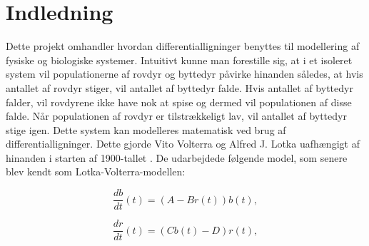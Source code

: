 \chapter{Indledning}





Dette projekt omhandler hvordan differentialligninger benyttes til modellering af fysiske og biologiske systemer. Intuitivt kunne man forestille sig, at i et isoleret system vil populationerne af rovdyr og byttedyr påvirke hinanden således, at hvis antallet af rovdyr stiger, vil antallet af byttedyr falde. Hvis antallet af byttedyr falder, vil rovdyrene ikke have nok at spise og dermed vil populationen af disse falde. Når populationen af rovdyr er tilstrækkeligt lav, vil antallet af byttedyr stige igen. 
Dette system kan modelleres matematisk ved brug af differentialligninger. Dette gjorde Vito Volterra og Alfred J. Lotka uafhængigt af hinanden i starten af 1900-tallet \citep{wikiLV}. De udarbejdede følgende model, som senere blev kendt som Lotka-Volterra-modellen:

\begin{equation}\label{byttedyr}
    \dfrac{db}{dt}(t) = (A-Br(t)) b(t), 
\end{equation}

\begin{equation}\label{rovdyr}
    \dfrac{dr}{dt}(t) = (Cb(t)-D) r(t),
\end{equation}

